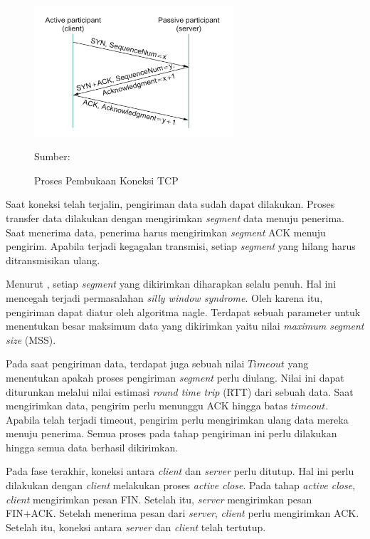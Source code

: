 \begin{figure}[!h]
  \centering
  \includegraphics[width=280px]{chapters/res/chapter-2/img/tcp.open.png}
  \caption{Proses Pembukaan Koneksi TCP} \label{fig:tcp.open}
  Sumber: \textcite{peterson2011}
\end{figure}

Saat koneksi telah terjalin, pengiriman data sudah dapat dilakukan. Proses transfer data dilakukan dengan mengirimkan \emph{segment} data menuju penerima. Saat menerima data, penerima harus mengirimkan \emph{segment} ACK menuju pengirim. Apabila terjadi kegagalan transmisi, setiap \emph{segment} yang hilang harus ditransmisikan ulang.

Menurut \textcite{peterson2011}, setiap \emph{segment} yang dikirimkan diharapkan selalu penuh. Hal ini mencegah terjadi permasalahan \emph{silly window syndrome}. Oleh karena itu, pengiriman dapat diatur oleh algoritma nagle. Terdapat sebuah parameter untuk menentukan besar maksimum data yang dikirimkan yaitu nilai \emph{maximum segment size} (MSS).

Pada saat pengiriman data, terdapat juga sebuah nilai $Timeout$ yang menentukan apakah proses pengiriman \emph{segment} perlu diulang. Nilai ini dapat diturunkan melalui nilai estimasi \emph{round time trip} (RTT) dari sebuah data. Saat mengirimkan data, pengirim perlu menunggu ACK hingga batas $timeout$. Apabila telah terjadi timeout, pengirim perlu mengirimkan ulang data mereka menuju penerima. Semua proses pada tahap pengiriman ini perlu dilakukan hingga semua data berhasil dikirimkan.

Pada fase terakhir, koneksi antara \emph{client} dan \emph{server} perlu ditutup. Hal ini perlu dilakukan dengan \emph{client} melakukan proses \emph{active close}. Pada tahap \emph{active close}, \emph{client} mengirimkan pesan FIN. Setelah itu, \emph{server} mengirimkan pesan FIN+ACK. Setelah menerima pesan dari \emph{server}, \emph{client} perlu mengirimkan ACK. Setelah itu, koneksi antara \emph{server} dan \emph{client} telah tertutup.

